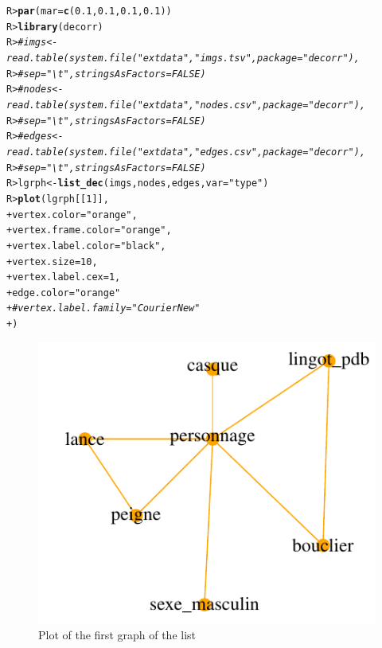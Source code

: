\documentclass[article]{jss}\usepackage[]{graphicx}\usepackage[]{color}
\makeatletter
\def\maxwidth{ %
  \ifdim\Gin@nat@width>\linewidth
    \linewidth
  \else
    \Gin@nat@width
  \fi
}
\newcommand{\hlnum}[1]{\textcolor[rgb]{0.686,0.059,0.569}{#1}}%
\newcommand{\hlstr}[1]{\textcolor[rgb]{0.192,0.494,0.8}{#1}}%
\newcommand{\hlcom}[1]{\textcolor[rgb]{0.678,0.584,0.686}{\textit{#1}}}%
\newcommand{\hlstd}[1]{\textcolor[rgb]{0.345,0.345,0.345}{#1}}%
\newcommand{\hlkwb}[1]{\textcolor[rgb]{0.69,0.353,0.396}{#1}}%
\newcommand{\hlkwc}[1]{\textcolor[rgb]{0.333,0.667,0.333}{#1}}%
\newcommand{\hlkwd}[1]{\textcolor[rgb]{0.737,0.353,0.396}{\textbf{#1}}}%
\newenvironment{kframe}{%
 \def\at@end@of@kframe{}%
 \ifinner\ifhmode%
  \def\at@end@of@kframe{\end{minipage}}%
  \begin{minipage}{\columnwidth}%
 \fi\fi%
 \def\FrameCommand##1{\hskip\@totalleftmargin \hskip-\fboxsep
 \colorbox{shadecolor}{##1}\hskip-\fboxsep
     \hskip-\linewidth \hskip-\@totalleftmargin \hskip\columnwidth}%
 \MakeFramed {\advance\hsize-\width
   \@totalleftmargin\z@ \linewidth\hsize
   \@setminipage}}%
 {\par\unskip\endMakeFramed%
 \at@end@of@kframe}
\newenvironment{knitrout}{}{} %
\makeatother
\begin{document}
\begin{knitrout}
\color{fgcolor}\begin{kframe}
\begin{alltt}
\hlstd{R> }\hlkwd{par}\hlstd{(}\hlkwc{mar}\hlstd{=}\hlkwd{c}\hlstd{(}\hlnum{0.1}\hlstd{,}\hlnum{0.1}\hlstd{,}\hlnum{0.1}\hlstd{,}\hlnum{0.1}\hlstd{) )}
\hlstd{R> }\hlkwd{library}\hlstd{(decorr)}
\hlstd{R> }\hlcom{# imgs <- read.table(system.file("extdata", "imgs.tsv", package = "decorr"),}
\hlstd{R> }\hlcom{#                       sep="\textbackslash{}t", stringsAsFactors = FALSE)}
\hlstd{R> }\hlcom{# nodes <- read.table(system.file("extdata", "nodes.csv", package = "decorr"),}
\hlstd{R> }\hlcom{#                     sep="\textbackslash{}t",stringsAsFactors = FALSE)}
\hlstd{R> }\hlcom{# edges <- read.table(system.file("extdata", "edges.csv", package = "decorr"),}
\hlstd{R> }\hlcom{#                     sep="\textbackslash{}t",stringsAsFactors = FALSE)}
\hlstd{R> }\hlstd{lgrph} \hlkwb{<-} \hlkwd{list_dec}\hlstd{(imgs,nodes,edges,}\hlkwc{var}\hlstd{=}\hlstr{"type"}\hlstd{)}
\hlstd{R> }\hlkwd{plot}\hlstd{(lgrph[[}\hlnum{1}\hlstd{]],}
\hlstd{+ }     \hlkwc{vertex.color} \hlstd{=} \hlstr{"orange"}\hlstd{,}
\hlstd{+ }     \hlkwc{vertex.frame.color}\hlstd{=}\hlstr{"orange"}\hlstd{,}
\hlstd{+ }     \hlkwc{vertex.label.color} \hlstd{=} \hlstr{"black"}\hlstd{,}
\hlstd{+ }     \hlkwc{vertex.size} \hlstd{=} \hlnum{10}\hlstd{,}
\hlstd{+ }     \hlkwc{vertex.label.cex} \hlstd{=} \hlnum{1}\hlstd{,}
\hlstd{+ }     \hlkwc{edge.color} \hlstd{=} \hlstr{"orange"}
\hlstd{+ }     \hlcom{# vertex.label.family="Courier New"}
\hlstd{+ }     \hlstd{)}
\end{alltt}
\end{kframe}\begin{figure}[H]

{\centering \includegraphics[width=\maxwidth]{figure/unnamed-chunk-9-1} 

}

\caption{\label{fig:figs}Plot of the first graph of the list}\label{fig:unnamed-chunk-9}
\end{figure}


\end{knitrout}
\end{document}
